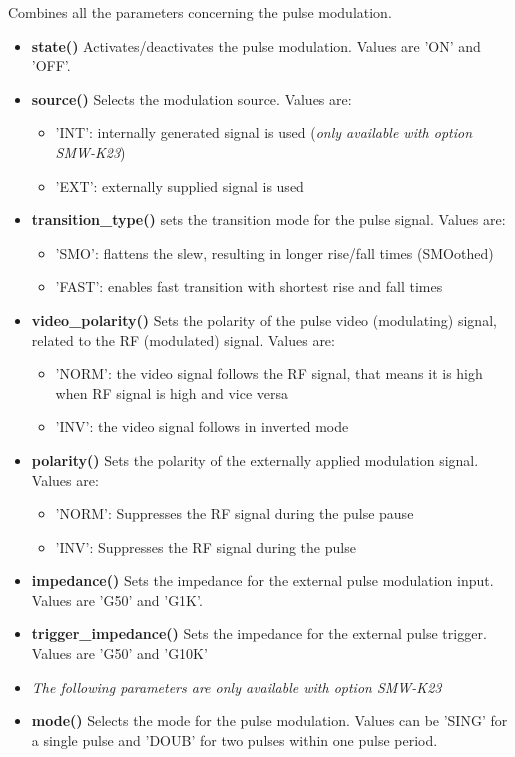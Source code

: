 \documentclass[11pt]{article} %
\begin{document}
Combines all the parameters concerning the pulse modulation.
\begin{itemize}
\item {\bf state()} Activates/deactivates the pulse modulation. Values are 'ON' and 'OFF'.
\item {\bf source()} Selects the modulation source. Values are:
	\begin{itemize}[]
	\item 'INT': internally generated signal is used ({\it only available with option SMW-K23})
	\item 'EXT': externally supplied signal is used
	\end{itemize}
\item {\bf transition\_type()} sets the transition mode for the pulse signal. Values are:
	\begin{itemize}[]
	\item 'SMO': flattens the slew, resulting in longer rise/fall times (SMOothed)
	\item 'FAST': enables fast transition with shortest rise and fall times
	\end{itemize}
\item {\bf video\_polarity()} Sets the polarity of the pulse video (modulating) signal, related to the RF (modulated) signal. Values are:
	\begin{itemize}[]
	\item 'NORM': the video signal follows the RF signal, that means it is high when RF signal is high and vice versa
	\item 'INV': the video signal follows in inverted mode
	\end{itemize}
\item {\bf polarity()} Sets the polarity of the externally applied modulation signal. Values are:
	\begin{itemize}[]
	\item 'NORM': Suppresses the RF signal during the pulse pause
	\item 'INV': Suppresses the RF signal during the pulse
	\end{itemize}
\item {\bf impedance()} Sets the impedance for the external pulse modulation input. Values are 'G50' and 'G1K'.
\item {\bf trigger\_impedance()} Sets the impedance for the external pulse trigger. Values are 'G50' and 'G10K'
\item[] {\it The following parameters are only available with option SMW-K23}
\item {\bf mode()} Selects the mode for the pulse modulation. Values can be 'SING' for a single pulse and 'DOUB' for two pulses within one pulse period.

\end{itemize}
\end{document}
